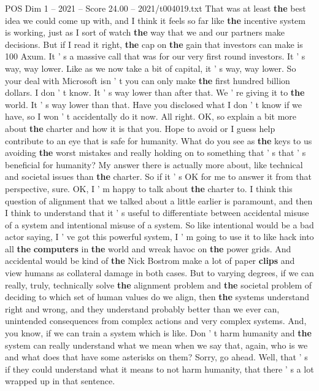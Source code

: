 \begin{textsample}{POS Dim 1 – 2021 – Score 24.00 – 2021/t004019.txt}
That was at least \textbf{the} best idea we could come up with, and I think it feels so far like \textbf{the} incentive system is working, just as I sort of watch \textbf{the} way that we and our partners make decisions.
But if I read it right, \textbf{the} cap on \textbf{the} gain that investors can make is 100 Axum.
It ' s a massive call that was for our very first round investors.
It ' s way, way lower.
Like as we now take a bit of capital, it ' s way, way lower.
So your deal with Microsoft isn ' t you can only make \textbf{the} first hundred billion dollars.
I don ' t know.
It ' s way lower than after that.
We ' re giving it to \textbf{the} world.
It ' s way lower than that.
Have you disclosed what I don ' t know if we have, so I won ' t accidentally do it now.
All right.
OK, so explain a bit more about \textbf{the} charter and how it is that you.
Hope to avoid or I guess help contribute to an eye that is safe for humanity.
What do you see as \textbf{the} keys to us avoiding \textbf{the} worst mistakes and really holding on to something that ' s that ' s beneficial for humanity?
My answer there is actually more about, like technical and societal issues than \textbf{the} charter.
So if it ' s OK for me to answer it from that perspective, sure.
OK, I ' m happy to talk about \textbf{the} charter to.
I think this question of alignment that we talked about a little earlier is paramount, and then I think to understand that it ' s useful to differentiate between accidental misuse of a system and intentional misuse of a system.
So like intentional would be a bad actor saying, I ' ve got this powerful system, I ' m going to use it to like hack into all \textbf{the} \textbf{computers} in \textbf{the} world and wreak havoc on \textbf{the} power grids.
And accidental would be kind of \textbf{the} Nick Bostrom make a lot of paper \textbf{clips} and view humans as collateral damage in both cases.
But to varying degrees, if we can really, truly, technically solve \textbf{the} alignment problem and \textbf{the} societal problem of deciding to which set of human values do we align, then \textbf{the} systems understand right and wrong, and they understand probably better than we ever can, unintended consequences from complex actions and very complex systems.
And, you know, if we can train a system which is like.
Don ' t harm humanity and \textbf{the} system can really understand what we mean when we say that, again, who is we and what does that have some asterisks on them?
Sorry, go ahead.
Well, that ' s if they could understand what it means to not harm humanity, that there ' s a lot wrapped up in that sentence.

\end{textsample}
